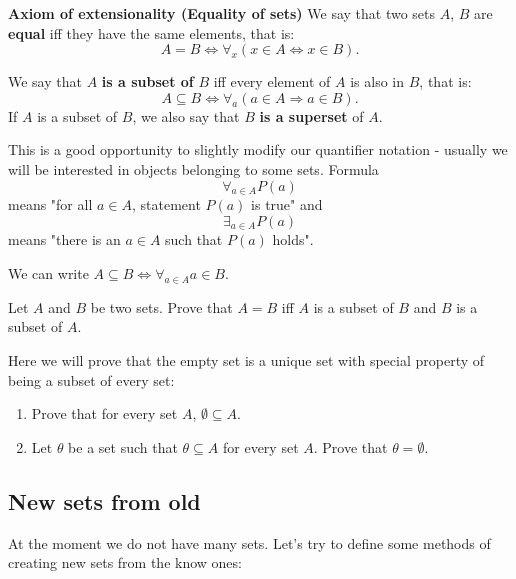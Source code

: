\begin{definition}
  \textbf{Axiom of extensionality (Equality of sets)} We say that two sets $A$, $B$ are \textbf{equal} iff they have the same elements, that is:
  $$A=B\Leftrightarrow \forall_x (x\in A \Leftrightarrow x\in B).$$
\end{definition}

\begin{definition}
  We say that $A$ \textbf{is a subset of} $B$ iff every element of $A$ is also in $B$, that is:
  $$A\subseteq B \Leftrightarrow \forall_a (a\in A\Rightarrow a\in B).$$
  If $A$ is a subset of $B$, we also say that $B$ \textbf{is a superset} of $A$.
\end{definition}

This is a good opportunity to slightly modify our quantifier notation - usually we will be interested in objects belonging to some sets.
Formula $$\forall_{a\in A} P(a)$$ means "for all $a\in A$, statement $P(a)$ is true"
and $$\exists_{a\in A} P(a)$$ means "there is an $a\in A$ such that $P(a)$ holds".

\begin{example}
  We can write $A\subseteq B \Leftrightarrow \forall_{a\in A} a\in B$.
\end{example}

\begin{exercise}
  Let $A$ and $B$ be two sets. Prove that $A=B$ iff $A$ is a subset of $B$ and $B$ is a subset of $A$.
\end{exercise}

\begin{exercise}
  Here we will prove that the empty set is a unique set with special property of being a subset of every set:
  \begin{enumerate}
    \item Prove that for every set $A$, $\emptyset\subseteq A$.
    \item Let $\theta$ be a set such that $\theta \subseteq A$ for every set $A$. Prove that $\theta=\emptyset$.
  \end{enumerate}
\end{exercise}

\subsection{New sets from old}
At the moment we do not have many sets. Let's try to define some methods of creating new sets from the know ones:

